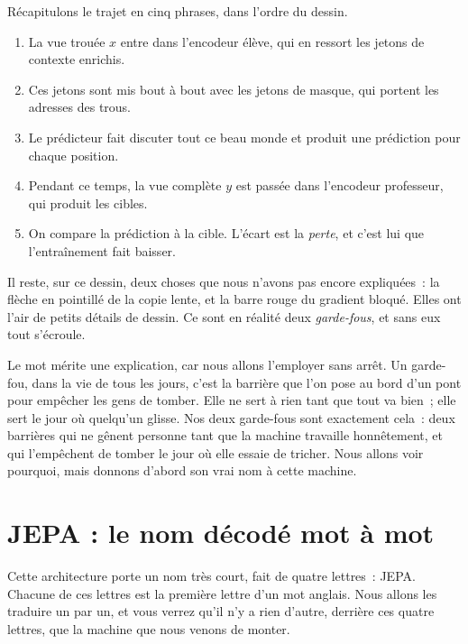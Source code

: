 Récapitulons le trajet en cinq phrases, dans l'ordre du dessin.

\begin{enumerate}
  \item La vue trouée $x$ entre dans l'encodeur élève, qui en ressort les
        jetons de contexte enrichis.
  \item Ces jetons sont mis bout à bout avec les jetons de masque, qui
        portent les adresses des trous.
  \item Le prédicteur fait discuter tout ce beau monde et produit une
        prédiction pour chaque position.
  \item Pendant ce temps, la vue complète $y$ est passée dans l'encodeur
        professeur, qui produit les cibles.
  \item On compare la prédiction à la cible. L'écart est la \emph{perte}, et
        c'est lui que l'entraînement fait baisser.
\end{enumerate}

Il reste, sur ce dessin, deux choses que nous n'avons pas encore
expliquées~: la flèche en pointillé de la copie lente, et la barre rouge du
gradient bloqué. Elles ont l'air de petits détails de dessin. Ce sont en
réalité deux \emph{garde-fous}, et sans eux tout s'écroule.

Le mot mérite une explication, car nous allons l'employer sans arrêt. Un
garde-fou, dans la vie de tous les jours, c'est la barrière que l'on pose au
bord d'un pont pour empêcher les gens de tomber. Elle ne sert à rien tant
que tout va bien~; elle sert le jour où quelqu'un glisse. Nos deux
garde-fous sont exactement cela~: deux barrières qui ne gênent personne tant
que la machine travaille honnêtement, et qui l'empêchent de tomber le jour
où elle essaie de tricher. Nous allons voir pourquoi, mais donnons d'abord
son vrai nom à cette machine.

\section{JEPA : le nom décodé mot à mot}

\begin{enclair}
Cette architecture porte un nom très court, fait de quatre lettres~: JEPA.
Chacune de ces lettres est la première lettre d'un mot anglais. Nous allons
les traduire un par un, et vous verrez qu'il n'y a rien d'autre, derrière
ces quatre lettres, que la machine que nous venons de monter.
\end{enclair}

